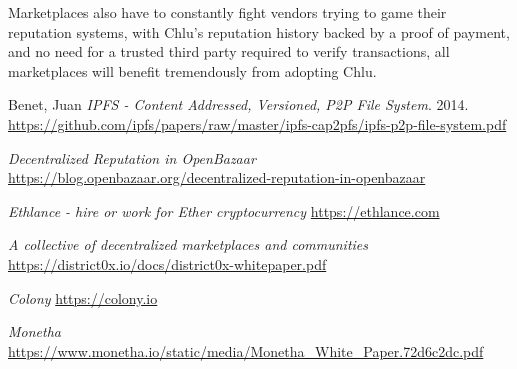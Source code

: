 \documentclass[a4paper]{article}
\begin{document}
Marketplaces also have to constantly fight vendors trying to game
their reputation systems, with Chlu's reputation history backed by a
proof of payment, and no need for a trusted third party required to
verify transactions, all marketplaces will benefit tremendously from
adopting Chlu.

\medskip
 
\begin{thebibliography}{9}

  Benet, Juan
  \textit{IPFS - Content Addressed, Versioned, P2P File System}. 2014.
  \url{https://github.com/ipfs/papers/raw/master/ipfs-cap2pfs/ipfs-p2p-file-system.pdf}

  \textit{Decentralized Reputation in OpenBazaar}
  \newline
  \url{https://blog.openbazaar.org/decentralized-reputation-in-openbazaar}

  \textit{Ethlance - hire or work for Ether cryptocurrency}
  \url{https://ethlance.com}

  \textit{A collective of decentralized marketplaces and communities}
  \url{https://district0x.io/docs/district0x-whitepaper.pdf}

  \textit{Colony}
  \url{https://colony.io}

  \textit{Monetha}
  \url{https://www.monetha.io/static/media/Monetha_White_Paper.72d6c2dc.pdf}
  
\end{thebibliography}
\end{document}
